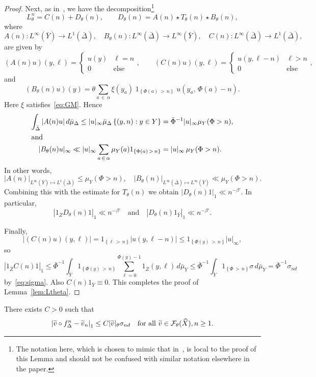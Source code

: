 \documentclass[AHL,Unicode,longabstracts,published]{cedram}
\newcommand{\cF}{\mathcal{F}}
\newcommand{\hX}{\widehat{X}}
\newcommand{\tv}{\tilde{v}}
\newcommand{\bY}{\bar{Y}}
\newcommand{\bZ}{\bar{Z}}
\newcommand{\bDelta}{\bar{\Delta}}
\newcommand{\bPhi}{\bar{\Phi}}
\let\oldtilde\tilde
\renewcommand*{\tilde}[1]{\mathchoice{\widetilde{#1}}{\widetilde{#1}}{\oldtilde{#1}}{\oldtilde{#1}}}
\begin{document}
\begin{proof}
Next, as in~\cite[Equation~(11)]{Gouezel05}, we have the decomposition\footnote{The notation here, which is chosen to mimic that in~\cite{Gouezel05}, is local to the proof of this Lemma and should not be confused with similar notation elsewhere in the paper.}
\[
L_\theta^n=C(n)+D_\theta(n), \qquad D_\theta(n)=A(n)\star T_\theta(n)\star B_\theta(n),
\]
where
\[
A(n):L^\infty(\bY)\to L^1(\bDelta), \quad B_\theta(n):L^\infty(\bDelta)\to L^\infty(\bY), \quad C(n):L^\infty(\bDelta)\to L^1(\bDelta),
\]
are given by
\[
(A(n)u)(y,\ell)=
\begin{cases} u(y) & \ell=n \\ 0 & \text{else}
\end{cases},
\qquad (C(n)u)(y,\ell)=
\begin{cases} u(y,\ell-n) & \ell>n \\ 0 & \text{else}
\end{cases},
\]
and
\[
(B_\theta(n)u)(y)=\theta\sum_{a\,\in\,\alpha}\xi(y_a)\;1_{\left\{\Phi(a)\,>\,n\right\}}\;u(y_a,\,\Phi(a)-n).
\]
Here $\xi$ satisfies~\eqref{eq:GM}. Hence
\begin{align*}
\int_{\bDelta}|A(n)u|\,d\bar\mu_\Delta \le |u|_\infty \bar\mu_\Delta \left\{(y, n):y\in Y\right\} &=\bPhi^{-1}|u|_\infty\mu_Y(\Phi>n),
\\
\intertext{and}
|B_\theta(n)u|_\infty\ll |u|_\infty\sum_{a\,\in\,\alpha}\mu_Y(a)1_{\left\{\Phi(a)\,>\,n\right\}} &=|u|_\infty\,\mu_Y(\Phi>n).
\end{align*}
In other words,
\[
|A(n)|_{L^\infty(\bY)\mapsto L^1(\bDelta)}\le \mu_Y(\Phi>n),
\quad {|B_\theta(n)|}_{L^\infty(\bDelta)\mapsto L^\infty(\bY)}\ll \mu_Y(\Phi>n).
\]
Combining this with the estimate for $T_\theta(n)$ we obtain $|D_\theta(n)1|_1\ll n^{-\beta'}$. In particular,
\[
\left|1_{\bZ} D_\theta(n)1\right|_1 \ll n^{-\beta'}
\quad\text{and}\quad |D_\theta(n)1_{\bY}|_1 \ll n^{-\beta'}.
\]

Finally,
\[
\left|(C(n)u)(y,\ell)\right|=1_{\left\{\ell\,>\,n\right\}}|u(y,\ell-n)|\le 1_{\left\{\Phi(y)\,>\,n\right\}}|u|_\infty,
\]
so
\[
\left|1_{\bZ} C(n)1\right|_1\le
\bPhi^{-1}\int_{\bY} 1_{\left\{\Phi(y)\,>\,n\right\}}\sum_{\ell=0}^{\Phi(y)-1}1_{\bZ}(y,\ell)\,d\bar\mu_Y
\le \bPhi^{-1}\int_{\bY} 1_{\left\{\Phi\,>\,n\right\}}\sigma\,d\bar\mu_Y =\bPhi^{-1}\sigma_{nd}
\]
by~\eqref{eq:sigma}. Also $C(n)1_ {\bY}\equiv0$. This completes the proof of Lemma~\ref{lem:Ltheta}.
\end{proof}

\begin{coro} \label{cor:Ltheta}
There exists $C>0$ such that
\[
\left|\tv\circ f_\Delta^n-\tv_n\right|_1\le C|\tv|_\theta\sigma_{nd}
\quad\text{for all }\tv\in\cF_\theta(\hX), n\ge1.
\]
\end{coro}
\end{document}
